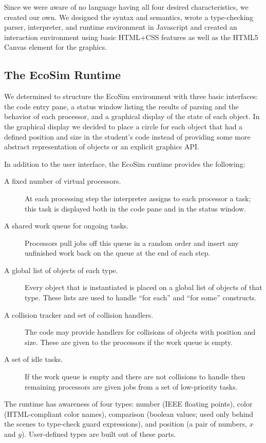 \documentclass{sig-alternate}
\newcommand{\EcoSim}{EcoSim}
\begin{document}
Since we were aware of no language having all four desired characteristics, 
we created our own.
We designed the syntax and semantics, 
wrote a type-checking parser, interpreter, and runtime environment in Javascript
and created an interaction environment using basic HTML+CSS features 
as well as the HTML5 Canvas element for the graphics.

\subsection{The \EcoSim{} Runtime}\label{sec:runtime}
We determined to structure the \EcoSim{} environment with three basic interfaces:
the code entry pane, 
a status window listing the results of parsing and the behavior of each processor,
and a graphical display of the state of each object.
In the graphical display we decided to place a circle for each object
that had a defined position and size in the student's code
instead of providing some more abstract representation of objects
or an explicit graphics API.

In addition to the user interface, the \EcoSim{} runtime provides the following:
\begin{description}
	\item[A fixed number of virtual processors.]
		At each processing step the interpreter assigns to each processor a task;
		this task is displayed both in the code pane and in the status window.
	\item[A shared work queue for ongoing tasks.]
		Processors pull jobs off this queue in a random order
		and insert any unfinished work back on the queue at the end of each step.
	\item[A global list of objects of each type.]
		Every object that is instantiated is placed on a global list of objects of that type.
		These lists are used to handle ``for each'' and ``for some'' constructs.
	\item[A collision tracker and set of collision handlers.]
		The code may provide handlers for collisions of objects with position and size.
		These are given to the processors if the work queue is empty.
	\item[A set of idle tasks.]
		If the work queue is empty and there are not collisions to handle
		then remaining processors are given jobs from a set of low-priority tasks.
\end{description}

The runtime has awareness of four types:
number (IEEE floating points), color (HTML-compliant color names), 
comparison (boolean values; used only behind the scenes to type-check guard expressions),
and position (a pair of numbers, $x$ and $y$).
User-defined types are built out of these parts.
\end{document}
